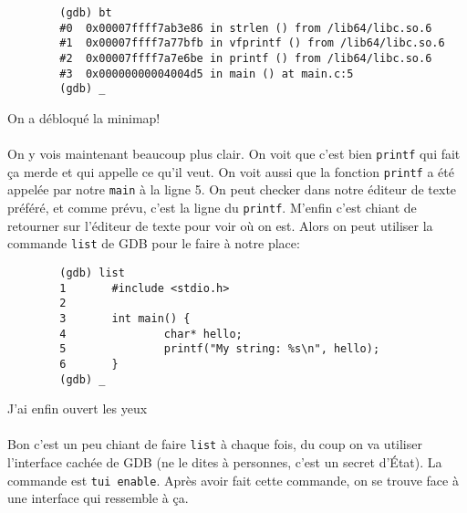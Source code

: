 \begin{listing}[H]
	\begin{verbatim}
		(gdb) bt
		#0  0x00007ffff7ab3e86 in strlen () from /lib64/libc.so.6
		#1  0x00007ffff7a77bfb in vfprintf () from /lib64/libc.so.6
		#2  0x00007ffff7a7e6be in printf () from /lib64/libc.so.6
		#3  0x00000000004004d5 in main () at main.c:5
		(gdb) _
	\end{verbatim}
	\caption{On a débloqué la minimap!}
\end{listing}

\paragraph{} On y vois maintenant beaucoup plus clair. On voit que c'est bien
\texttt{printf} qui fait ça merde et qui appelle ce qu'il veut. On voit
aussi que la fonction \texttt{printf} a été appelée par notre
\texttt{main} à la ligne 5. On peut checker dans notre éditeur de texte
préféré, et comme prévu, c'est la ligne du \texttt{printf}. M'enfin
c'est chiant de retourner sur l'éditeur de texte pour voir où on est. Alors on
peut utiliser la commande \texttt{list} de GDB pour le faire à notre place:

\begin{listing}[H]
	\begin{verbatim}
		(gdb) list
		1       #include <stdio.h>
		2
		3       int main() {
		4               char* hello;
		5               printf("My string: %s\n", hello);
		6       }
		(gdb) _
	\end{verbatim}
	\caption{J'ai enfin ouvert les yeux}
\end{listing}

\paragraph{} Bon c'est un peu chiant de faire \texttt{list} à chaque fois, du
coup on va utiliser l'interface cachée de GDB (ne le dites à personnes, c'est
un secret d'État). La commande est \texttt{tui enable}. Après avoir fait cette
commande, on se trouve face à une interface qui ressemble à ça.

